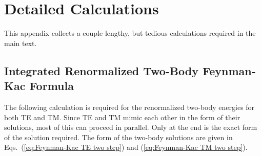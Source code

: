 \chapter{Detailed Calculations}
\label{app:nasty_calc}
This appendix collects a couple lengthy, but tedious calculations required in the main text.  

\section{Integrated Renormalized Two-Body Feynman-Kac Formula}

The following calculation is required for the renormalized two-body energies for both TE and 
TM.  Since TE and TM mimic each other in the form of their solutions, most of this can proceed in 
parallel.  Only at the end is the exact form of the solution required.  The form of the two-body
solutions are given in Eqs.~(\ref{eq:Feynman-Kac TE two step}) and (\ref{eq:Feynman-Kac TM two step}).

